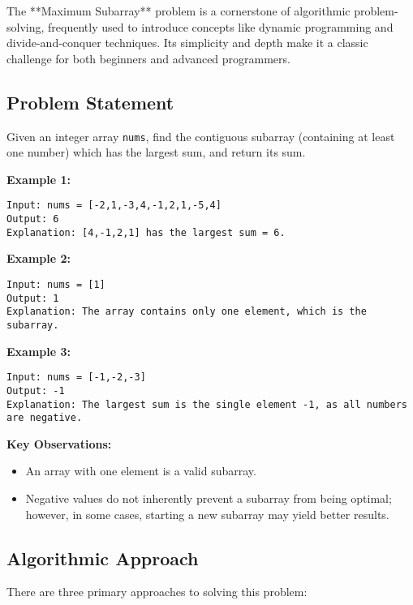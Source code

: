 \label{problem:Maximum_Subarray}

The **Maximum Subarray** problem is a cornerstone of algorithmic problem-solving, frequently used to introduce concepts like dynamic programming and divide-and-conquer techniques. Its simplicity and depth make it a classic challenge for both beginners and advanced programmers.

\subsection*{Problem Statement}
Given an integer array \texttt{nums}, find the contiguous subarray (containing at least one number) which has the largest sum, and return its sum.

\textbf{Example 1:}
\begin{verbatim}
Input: nums = [-2,1,-3,4,-1,2,1,-5,4]
Output: 6
Explanation: [4,-1,2,1] has the largest sum = 6.
\end{verbatim}

\textbf{Example 2:}
\begin{verbatim}
Input: nums = [1]
Output: 1
Explanation: The array contains only one element, which is the subarray.
\end{verbatim}

\textbf{Example 3:}
\begin{verbatim}
Input: nums = [-1,-2,-3]
Output: -1
Explanation: The largest sum is the single element -1, as all numbers are negative.
\end{verbatim}

\textbf{Key Observations:}
\begin{itemize}
    \item An array with one element is a valid subarray.
    \item Negative values do not inherently prevent a subarray from being optimal; however, in some cases, starting a new subarray may yield better results.
\end{itemize}

\subsection*{Algorithmic Approach}
There are three primary approaches to solving this problem:

